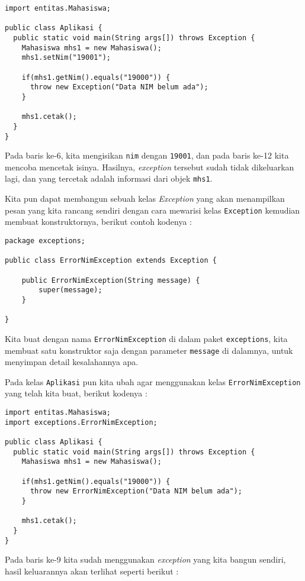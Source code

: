 \begin{lstlisting}
import entitas.Mahasiswa;

public class Aplikasi {
  public static void main(String args[]) throws Exception {
    Mahasiswa mhs1 = new Mahasiswa();
    mhs1.setNim("19001");

    if(mhs1.getNim().equals("19000")) {
      throw new Exception("Data NIM belum ada");
    }

    mhs1.cetak();
  }
}
\end{lstlisting}

Pada baris ke-6, kita mengisikan \texttt{nim} dengan \texttt{19001}, dan pada baris ke-12 kita mencoba mencetak isinya. Hasilnya, \textit{exception} tersebut sudah tidak dikeluarkan lagi, dan yang tercetak adalah informasi dari objek \texttt{mhs1}.

Kita pun dapat membangun sebuah kelas \textit{Exception} yang akan menampilkan pesan yang kita rancang sendiri dengan cara mewarisi kelas \texttt{Exception} kemudian membuat konstruktornya, berikut contoh kodenya :

\begin{lstlisting}
package exceptions;

public class ErrorNimException extends Exception {

    public ErrorNimException(String message) {
        super(message);
    }

}
\end{lstlisting}

Kita buat dengan nama \texttt{ErrorNimException} di dalam paket \texttt{exceptions}, kita membuat satu konstruktor saja dengan parameter \texttt{message} di dalamnya, untuk menyimpan detail kesalahannya apa.

Pada kelas \texttt{Aplikasi} pun kita ubah agar menggunakan kelas \texttt{ErrorNimException} yang telah kita buat, berikut kodenya :

\begin{lstlisting}
import entitas.Mahasiswa;
import exceptions.ErrorNimException;

public class Aplikasi {
  public static void main(String args[]) throws Exception {
    Mahasiswa mhs1 = new Mahasiswa();

    if(mhs1.getNim().equals("19000")) {
      throw new ErrorNimException("Data NIM belum ada");
    }
    
    mhs1.cetak();
  }
}
\end{lstlisting}

Pada baris ke-9 kita sudah menggunakan \textit{exception} yang kita bangun sendiri, hasil keluarannya akan terlihat seperti berikut :

